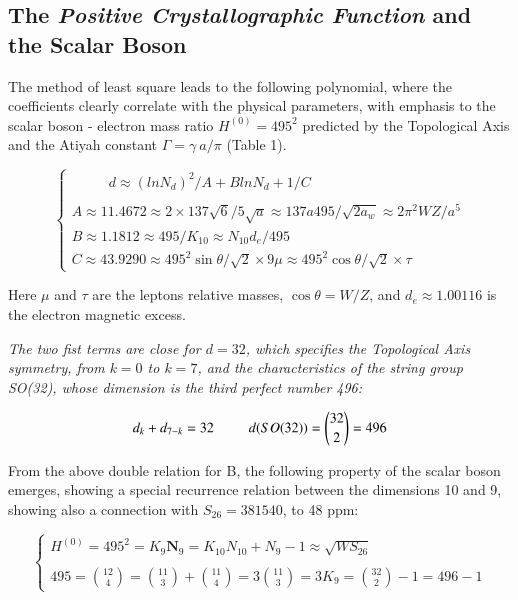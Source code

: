 \documentclass[a4paper,9pt]{article}
\begin{document}

\subsection{The \textit{Positive Crystallographic Function} and the Scalar Boson}

The method of least square leads to the following polynomial, where the coefficients clearly correlate with the physical parameters, with emphasis to the scalar boson - electron mass ratio $H^{(0)} = 495^2$ predicted by the Topological Axis and the Atiyah constant $\Gamma = \gamma~a/\pi$ (Table 1).

\begin{equation}\label{Eq23}
 \left\{
    \begin{array}{ll}
        ~~~~~~~~~~~~ d \approx (lnN_d)^2/A + BlnN_d + 1/C\\
        \\
        A\approx 11.4672 \approx 2\times 137 \sqrt 6/5 \sqrt a\approx 137a495/\sqrt{2a_w}  \approx 2\pi^2WZ/a^5\\ 
        B \approx 1.1812 \approx 495/K_{10} \approx N_{10}d_e/495   \\ 
        C\approx 43.9290 \approx 495^2 \sin \theta/\sqrt2 \times 9\mu  \approx 495^2 \cos \theta/\sqrt2\times \tau
    \end{array}
\right.
\end{equation}

Here $\mu$ and $\tau$ are the leptons relative masses, $\cos \theta = W/Z$, and $d_e \approx 1.00116$ is the electron magnetic excess. 

 \textit{The two fist terms are close for $d = 32$, which specifies the Topological Axis symmetry, from $k = 0$ to $k = 7$, and the characteristics of the string group SO(32), whose dimension is the third perfect number 496:}
 
 
 \begin{equation}\label{Eq24}
 d_k + d_{7-k} = 32 ~~~~~~~~~~ d(SO(32)) =  \binom{32}{2} = 496 \\ 
 \end{equation}

From the above double relation for B, the following property of the scalar boson emerges, showing a special recurrence relation between the dimensions 10 and 9, showing also a connection with $S_{26} = 381540$, to 48 ppm:

\begin{equation}\label{Eq25}
 \left\{
    \begin{array}{ll} 
            H^{(0)} = 495^2 = K_{9}\textbf{N}_9 = K_{10} N_{10} + N_{9} - 1 \approx \sqrt{WS_{26}} \\ 
            \\
       495 = \binom{12}{4} = \binom{11}{3} + \binom{11}{4} = 3\binom{11}{3} = 3K_9 = \binom{32}{2} - 1 = 496 -1
    \end{array}
\right.
\end{equation}
\end{document}
